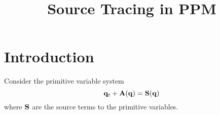 \documentclass[times,modern]{aastex63}
\newcommand{\Sb}{{\bf S}}
\begin{document}
\title{Source Tracing in PPM}



\shortauthors{}








\begin{abstract}
\end{abstract}


\section{Introduction}\label{Sec:Introduction}

Consider the primitive variable system
\begin{equation}
\qb_t + \Ab(\qb) = \Sb(\qb)
\end{equation}
where $\Sb$ are the source terms to the primitive variables.
\end{document}
